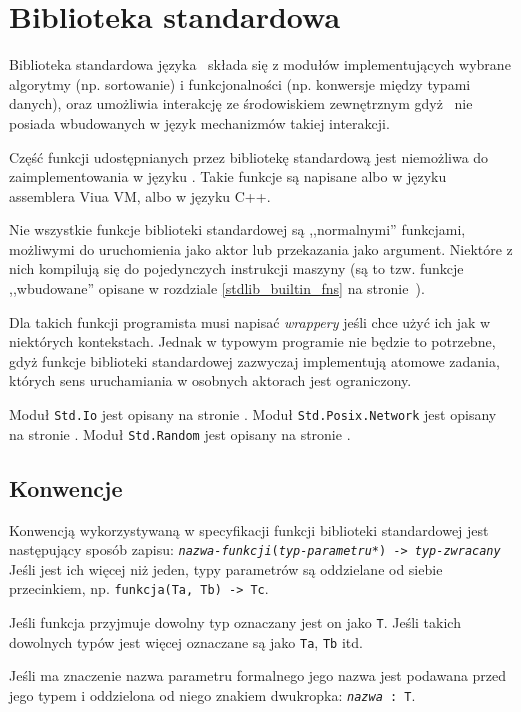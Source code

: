\section{Biblioteka standardowa}

Biblioteka standardowa języka \ViuAct\ składa się z modułów implementujących
wybrane algorytmy (np. sortowanie) i funkcjonalności (np. konwersje między
typami danych), oraz umożliwia interakcję ze środowiskiem zewnętrznym gdyż
\ViuAct\ nie posiada wbudowanych w język mechanizmów takiej interakcji.

Część funkcji udostępnianych przez bibliotekę standardową jest niemożliwa do
zaimplementowania w języku \ViuAct. Takie funkcje są napisane albo w języku
assemblera Viua VM, albo w języku C++.

Nie wszystkie funkcje biblioteki standardowej są ,,normalnymi'' funkcjami,
możliwymi do uruchomienia jako aktor lub przekazania jako argument. Niektóre z
nich kompilują się do pojedynczych instrukcji maszyny (są to tzw. funkcje
,,wbudowane'' opisane w rozdziale \ref{stdlib_builtin_fns} na
stronie~\pageref{stdlib_builtin_fns}).

Dla takich funkcji programista musi napisać \emph{wrappery} jeśli chce użyć ich jak w niektórych kontekstach.
Jednak w typowym programie nie będzie to potrzebne, gdyż funkcje biblioteki standardowej zazwyczaj
implementują atomowe zadania, których sens uruchamiania w osobnych aktorach jest ograniczony.

Moduł \texttt{Std.Io} jest opisany na stronie \pageref{stdlib_Std_Io}.
Moduł \texttt{Std.Posix.Network} jest opisany na stronie \pageref{stdlib_Std_Posix_Network}.
Moduł \texttt{Std.Random} jest opisany na stronie \pageref{stdlib_Std_Random}.

\subsection*{Konwencje}

Konwencją wykorzystywaną w specyfikacji funkcji biblioteki standardowej jest
następujący sposób zapisu:
\texttt{\emph{nazwa-funkcji}(\emph{typ-parametru}*) -> \emph{typ-zwracany}}
Jeśli jest ich więcej niż jeden, typy parametrów są oddzielane od siebie
przecinkiem, np.
\texttt{funkcja(Ta, Tb) -> Tc}.

Jeśli funkcja przyjmuje dowolny typ oznaczany jest on jako \texttt{T}. Jeśli
takich dowolnych typów jest więcej oznaczane są jako \texttt{Ta}, \texttt{Tb}
itd.

Jeśli ma znaczenie nazwa parametru formalnego jego nazwa jest podawana przed
jego typem i oddzielona od niego znakiem dwukropka:
\texttt{\emph{nazwa}~:~T}.

